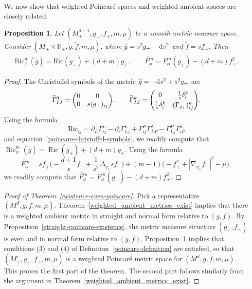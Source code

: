 \documentclass[10pt,a4paper]{amsart}
\DeclareMathOperator{\Ric}{Ric}
\numberwithin{equation}{section}
\newtheorem{Proposition}[Theorem]{Proposition}
 { \theoremstyle{definition}
\newtheorem{Definition}[Theorem]{Definition}
\newtheorem{Note}[Theorem]{Note}
\newtheorem{Example}[Theorem]{Example}
\newtheorem{Remark}[Theorem]{Remark} }
\begin{document}
We now show that weighted Poincar\'e spaces and weighted ambient spaces are closely related.

\begin{Proposition}
\label{ricci-poincare-condition}
Let $(M_+^{d+1},g_+,f_+,m,\mu)$ be a smooth metric measure space. Consider $(M_+\times \mathbb{R}_+,\widetilde{g},\widetilde{f},m,\mu)$, where $\widetilde{g}=s^2 g_+-{\rm d}s^2$ and $\widetilde{f}=sf_+$. Then
\begin{gather*}
\mathrm{Ric}_{\phi}^m(\widetilde{g})=\mathrm{Ric}(g_+)+(d+m)g_+,
\qquad
\widetilde{F_\phi^m} =F_\phi^m(g_+)-(d+m)f_+^2.
\end{gather*}
\end{Proposition}

\begin{proof}
The Christoffel symbols of the metric $\widetilde{g}=-{\rm d}s^2+s^2g_+$ are
\begin{equation}
\label{poincare-christoffel-symbols}
\widetilde{\Gamma}_{IJ}^0=\begin{pmatrix}0&0\\0& s(g_+)_{ij} \end{pmatrix}\!,\qquad
\widetilde{\Gamma}_{IJ}^k=\begin{pmatrix}0&\frac{1}{s}\delta_i^k\vspace{1mm}\\\frac{1}{s}\delta_i^k& (\Gamma_{g_+})_{ij}^k \end{pmatrix}\!.
\end{equation}
Using the formula
\begin{equation*}
\mathrm{Ric}_{i j}=\partial_L \Gamma_{i j}^{L}-\partial_i \Gamma_{L j}^{L}+\Gamma_{i j}^{P} \Gamma_{L P}^{L}-\Gamma_{L j}^{P} \Gamma_{i P}^{L}
\end{equation*}
and equation~\eqref{poincare-christoffel-symbols}, we readily compute that $\Ric_{\phi}^m(\widetilde{g})=\Ric(g_+)+(d+m)g_+$.
Using the formula
\begin{equation*}
 \widetilde{F_\phi^m}=sf_+\biggl(-\frac{d+1}{s}f_++\frac{1}{s^2}\Delta_{g_+}sf_+\biggr) +(m-1)\big({-}f_+^2+|\nabla_{g_+}f_+|^2-\mu\big),
\end{equation*}
we readily compute that $\widetilde{F_\phi^m}=F_\phi^m(g_+)-(d+m)f_+^2.$ \qedhere
\end{proof}

\begin{proof}[Proof of Theorem~\ref{existence-even-poincare}]
Pick a representative $(M^d,g,f,m,\mu)$. Theorem~\ref{weighted_ambient_metrics_exist} implies that there is a weighted ambient metric in straight and normal form relative to $(g,f)$. By Proposition~\ref{straight-poincare-existence}, the metric measure structure $(g_+,f_+)$ is even and in normal form relative to $(g,f)$. Proposition~\ref{ricci-poincare-condition} implies that conditions (3) and (4) of Definition~\ref{poincare-definition} are satisfied, so that $(M_+^\circ,g_+,f_+,m,\mu)$ is a weighted Poincar\'e metric space for $(M^d,g,f,m,\mu)$. This proves the first part of the theorem. The second part follows similarly from the argument in Theorem~\ref{weighted_ambient_metrics_exist}.
\end{proof}
\end{document}
